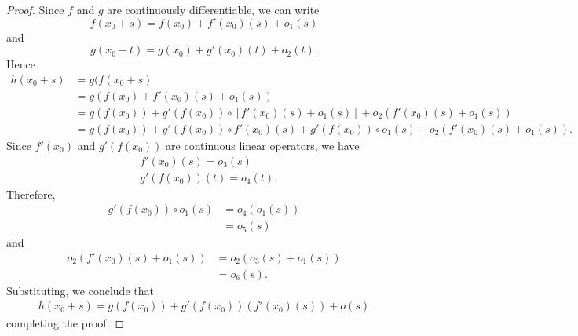 \documentclass[12pt,reqno]{amsart}
\numberwithin{equation}{section}  %
\begin{document}
  \begin{proof} Since $f$ and $g$ are continuously differentiable, we can write
			\begin{equation*}
				f(x_0 + s) = f(x_0) + f'(x_0)(s) + o_{1}(s)
			\end{equation*}
			and
      \begin{equation*}
				g(x_0 + t) = g(x_0) + g'(x_0)(t)+ o_{2}(t).
			\end{equation*}
						Hence
			\begin{equation}
        \label{pre-order}
				\begin{split}
					h(x_0 + s) &= g(f(x_0 +s)
					\\
					&= g(f(x_0) + f'(x_0)(s) + o_{1}(s))
					\\
					&= g(f(x_0)) + g'(f(x_0)) \circ [f'(x_0)(s) + o_{1}(s)] 
					+ o_{2}(f'(x_0)(s) + o_{1}(s))
					\\
					&= g(f(x_0)) + g'(f(x_0)) \circ f'(x_0)(s) +
					g'(f(x_0)) \circ o_{1}(s) + o_{2}(f'(x_0)(s) + o_{1}(s)).
				\end{split}
			\end{equation}
      Since $f'(x_0)$
			and $g'(f(x_0))$ are continuous linear operators, we have
			\begin{equation*}
				\begin{split}
         &  f'(x_0)(s)
           = o_{3}(s)
					\\
					& g'(f(x_0))(t) = o_{4}(t).
				\end{split}
			\end{equation*}
      Therefore,
      \begin{equation*}
        \begin{split}
          g'(f(x_0)) \circ o_{1}(s)
          & = o_{4}(o_{1}(s))
          \\
          & = o_{5}(s)
        \end{split}
      \end{equation*}
      and
      \begin{equation*}
      \begin{split}
      o_{2}(f'(x_0)(s) + o_{1}(s))
      & = o_{2}(o_{3}(s) + o_{1}(s))
      \\
      & =o_{6}(s).
      \end{split}
      \end{equation*}
Substituting, we conclude that
			\begin{equation*}
				\begin{split}
				h(x_0 + s) = g(f(x_0)) + g'(f(x_0))(f'(x_0)(s)) +
				o(s)
        \end{split}
        \end{equation*}
			 completing the proof. 
   \end{proof}
\end{document}

